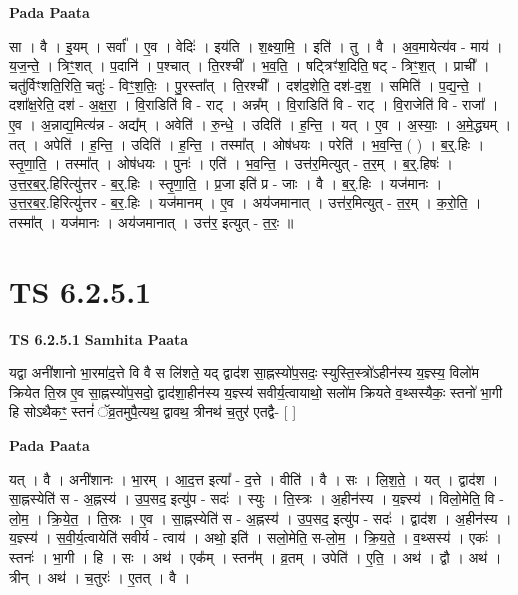 \documentclass[17pt]{extarticle}
\begin{document}
\textbf{Pada Paata} \newline

सा । वै । इ॒यम् । सर्वा᳚ । ए॒व । वेदिः॑ । इय॑ति । श॒क्ष्या॒मि॒ । इति॑ । तु । वै । अ॒व॒मायेत्य॑व - माय॑ । य॒ज॒न्ते॒ । त्रिꣳ॒॒शत् । प॒दानि॑ । प॒श्चात् । ति॒रश्ची᳚ । भ॒व॒ति॒ । षट्त्रिꣳ॑श॒दिति॒ षट् - त्रिꣳ॒॒श॒त् । प्राची᳚ । चतु॑र्विꣳशति॒रिति॒ चतुः॑ - विꣳ॒॒श॒तिः॒ । पु॒रस्ता᳚त् । ति॒रश्ची᳚ । दश॑द॒शेति॒ दश॑-द॒श॒ । समिति॑ । प॒द्य॒न्ते॒ । दशा᳚क्ष॒रेति॒ दश॑ - अ॒क्ष॒रा॒ । वि॒राडिति॑ वि - राट् । अन्न᳚म् । वि॒राडिति॑ वि - राट् । वि॒राजेति॑ वि - राजा᳚ । ए॒व । अ॒न्नाद्य॒मित्य॑न्न - अद्य᳚म् । अवेति॑ । रु॒न्धे॒ । उदिति॑ । ह॒न्ति॒ । यत् । ए॒व । अ॒स्याः॒ । अ॒मे॒द्ध्यम् । तत् । अपेति॑ । ह॒न्ति॒ । उदिति॑ । ह॒न्ति॒ । तस्मा᳚त् । ओष॑धयः । परेति॑ । भ॒व॒न्ति॒ ( ) । ब॒र्॒.हिः । स्तृ॒णा॒ति॒ । तस्मा᳚त् । ओष॑धयः । पुनः॑ । एति॑ । भ॒व॒न्ति॒ । उत्त॑र॒मित्युत् - त॒र॒म् । ब॒र्॒.हिषः॑ । उ॒त्त॒र॒ब॒र्॒.हिरित्यु॑त्तर - ब॒र्॒.हिः । स्तृ॒णा॒ति॒ । प्र॒जा इति॑ प्र - जाः । वै । ब॒र्॒.हिः । यज॑मानः । उ॒त्त॒र॒ब॒र॒.हिरित्यु॑त्तर - ब॒र॒.हिः । यज॑मानम् । ए॒व । अय॑जमानात् । उत्त॑र॒मित्युत् - त॒र॒म् । क॒रो॒ति॒ । तस्मा᳚त् । यज॑मानः । अय॑जमानात् । उत्त॑र॒ इत्युत् - त॒रः॒ ॥  \newline





\section{ TS 6.2.5.1 }

\textbf{TS 6.2.5.1 } \newline
\textbf{Samhita Paata} \newline

यद्वा अनी॑शानो भा॒रमा॑द॒त्ते वि वै स लि॑शते॒ यद् द्वाद॑श सा॒ह्नस्यो॑प॒सदः॒ स्युस्ति॒स्त्रो॑ऽहीन॑स्य य॒ज्ञ्स्य॒ विलो॑म क्रियेत ति॒स्र ए॒व सा॒ह्नस्यो॑प॒सदो॒ द्वाद॑शा॒हीन॑स्य य॒ज्ञ्स्य॑ सवीर्य॒त्वायाथो॒ सलो॑म क्रियते व॒थ्सस्यैकः॒ स्तनो॑ भा॒गी हि सोऽथैकꣳ॒॒ स्तनं॑ ॅव्र॒तमुपै॒त्यथ॒ द्वावथ॒ त्रीनथ॑ च॒तुर॑ एतद्वै- [  ] \newline

\textbf{Pada Paata} \newline

यत् । वै । अनी॑शानः । भा॒रम् । आ॒द॒त्त इत्या᳚ - द॒त्ते । वीति॑ । वै । सः । लि॒श॒ते॒ । यत् । द्वाद॑श । सा॒ह्नस्येति॑ स - अ॒ह्नस्य॑ । उ॒प॒सद॒ इत्यु॑प - सदः॑ । स्युः । ति॒स्त्रः । अ॒हीन॑स्य । य॒ज्ञ्स्य॑ । विलो॒मेति॒ वि - लो॒म॒ । क्रि॒ये॒त॒ । ति॒स्रः । ए॒व । सा॒ह्नस्येति॑ स - अ॒ह्नस्य॑ । उ॒प॒सद॒ इत्यु॑प - सदः॑ । द्वाद॑श । अ॒हीन॑स्य । य॒ज्ञ्स्य॑ । स॒वी॒र्य॒त्वायेति॑ सवीर्य - त्वाय॑ । अथो॒ इति॑ । सलो॒मेति॒ स-लो॒म॒ । क्रि॒य॒ते॒ । व॒थ्सस्य॑ । एकः॑ । स्तनः॑ । भा॒गी । हि । सः । अथ॑ । एक᳚म् । स्तन᳚म् । व्र॒तम् । उपेति॑ । ए॒ति॒ । अथ॑ । द्वौ । अथ॑ । त्रीन् । अथ॑ । च॒तुरः॑ । ए॒तत् । वै ।  \newline
\end{document}
